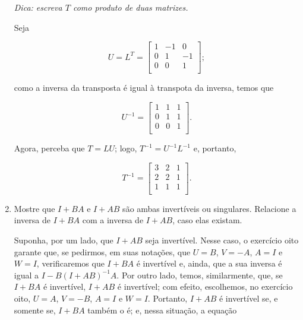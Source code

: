 \documentclass[leqno]{article}
\begin{document}
\begin{enumerate}
\textit{Dica: escreva $T$ como produto de duas matrizes.}

\begin{sol} 
	Seja 

	\begin{equation*} 
		U = L^T = 
		\begin{bmatrix} 
			1 & -1 & 0 \\ 
			0 & 1 & -1 \\ 
			0 & 0 & 1 \\ 
		\end{bmatrix};   
	\end{equation*} 

	\noindent como a inversa da transposta é igual à transpota da inversa, temos que 

	\begin{equation*} 
		U^{-1} = 
		\begin{bmatrix} 
			1 & 1 & 1 \\ 
			0 & 1 & 1 \\ 
			0 & 0 & 1 \\ 
		\end{bmatrix}.  
	\end{equation*} 
	
	Agora, perceba que $T = LU$; logo, $T^{-1} = U^{-1}L^{-1}$ e, portanto, 

	\begin{equation*} 
		T^{-1} = 
		\begin{bmatrix} 
			3 & 2 & 1 \\ 
			2 & 2 & 1 \\ 
			1 & 1 & 1 \\ 
		\end{bmatrix}.  
	\end{equation*} 
\end{sol} 

\item Mostre que $I + BA$ e $I + AB$ são ambas invertíveis ou singulares. Relacione a inversa de $I + BA$ com a inversa de $I + AB$, caso elas existam.

\begin{sol} 
	Suponha, por um lado, que $I + AB$ seja invertível. Nesse caso, o exercício oito garante que, se pedirmos, em suas notações, que $U = B$, $V = -A$, $A = I$ e $W = I$, verificaremos que $I + BA$ é invertível e, ainda, que a sua inversa é igual a $I - B(I + AB)^{-1}A$. Por outro lado, temos, similarmente, que, se $I + BA$ é invertível, $I + AB$ é invertível; com efeito, escolhemos, no exercício oito, $U = A$, $V = -B$, $A = I$ e $W = I$. Portanto, $I + AB$ é invertível se, e somente se, $I + BA$ também o é; e, nessa situação, a equação 


\end{sol}
\end{enumerate}
\end{document}
